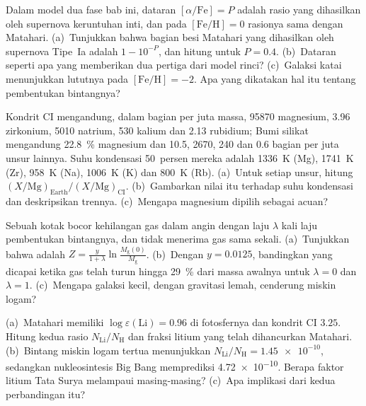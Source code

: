 \begin{exercise}[$\star\star$]\label{exo:b3:origin-of-elements:9}
Dalam model dua fase bab ini, dataran
$[\alpha/\mathrm{Fe}] = P$ adalah rasio yang dihasilkan oleh supernova keruntuhan inti,
dan pada $[\mathrm{Fe/H}] = 0$ rasionya sama dengan Matahari. (a)~Tunjukkan bahwa bagian
besi Matahari yang dihasilkan oleh supernova Tipe~Ia adalah $1 - 10^{-P}$, dan
hitung untuk $P = 0.4$. (b)~Dataran seperti apa yang memberikan dua pertiga
dari model rinci? (c)~Galaksi katai menunjukkan lututnya pada
$[\mathrm{Fe/H}] = -2$. Apa yang dikatakan hal itu tentang pembentukan bintangnya?
\end{exercise}

\begin{exercise}[$\star\star\star$]\label{exo:b3:origin-of-elements:10}
Kondrit CI mengandung, dalam bagian per juta massa, \num{95870}
magnesium, \num{3.96} zirkonium, \num{5010} natrium, \num{530}
kalium dan \num{2.13} rubidium; Bumi silikat mengandung
\qty{22.8}{\percent} magnesium dan \num{10.5}, \num{2670}, \num{240}
dan \num{0.6} bagian per juta unsur lainnya. Suhu kondensasi 50~persen
mereka adalah \qty{1336}{K} (Mg), \qty{1741}{K} (Zr),
\qty{958}{K} (Na), \qty{1006}{K} (K) dan \qty{800}{K} (Rb). (a)~Untuk
setiap unsur, hitung $(X/\mathrm{Mg})_\mathrm{Earth}/(X/\mathrm{Mg})_\mathrm{CI}$.
(b)~Gambarkan nilai itu terhadap suhu kondensasi dan deskripsikan
trennya. (c)~Mengapa magnesium dipilih sebagai acuan?
\end{exercise}

\begin{exercise}[$\star\star\star$]\label{exo:b3:origin-of-elements:11}
Sebuah kotak bocor kehilangan gas dalam angin dengan laju $\lambda$ kali laju
pembentukan bintangnya, dan tidak menerima gas sama sekali. (a)~Tunjukkan bahwa  adalah
$Z = \frac{y}{1 + \lambda}\ln\frac{M_\mathrm{g}(0)}{M_\mathrm{g}}$.
(b)~Dengan $y = 0.0125$, bandingkan  yang dicapai ketika gas telah
turun hingga \qty{29}{\percent} dari massa awalnya untuk $\lambda = 0$ dan
$\lambda = 1$. (c)~Mengapa galaksi kecil, dengan gravitasi lemah, cenderung
miskin logam?
\end{exercise}

\begin{exercise}[$\star\star\star$]\label{exo:b3:origin-of-elements:12}
(a)~Matahari memiliki $\log\varepsilon(\mathrm{Li}) = 0.96$ di fotosfernya
dan kondrit CI $3.25$. Hitung kedua rasio $N_\mathrm{Li}/N_\mathrm{H}$
dan fraksi litium yang telah dihancurkan Matahari. (b)~Bintang
miskin logam tertua menunjukkan $N_\mathrm{Li}/N_\mathrm{H} = \num{1.45e-10}$,
sedangkan nukleosintesis Big Bang memprediksi \num{4.72e-10}. Berapa faktor
litium Tata Surya melampaui masing-masing? (c)~Apa implikasi
dari kedua perbandingan itu?
\end{exercise}

